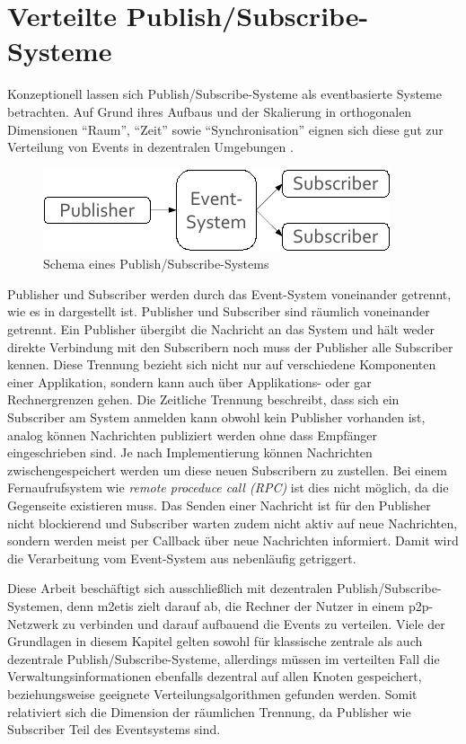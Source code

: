 \section{Verteilte Publish/Subscribe-Systeme}
\label{chap:grundlagen:pubsub}
Konzeptionell lassen sich Publish/Subscribe-Systeme als eventbasierte Systeme betrachten. Auf Grund ihres Aufbaus und der Skalierung  in orthogonalen Dimensionen \enquote{Raum}, \enquote{Zeit} sowie \enquote{Synchronisation} eignen sich diese gut zur Verteilung von Events in dezentralen Umgebungen \cite{PatrickTh2003Many, Cugola2002Using}.

\begin{figure}[htbp]
\centering
\includegraphics{grafics/pubsub_black_box.pdf}
\caption{Schema eines Publish/Subscribe-Systems}
\label{fig:pubsub_black_box}
\end{figure}

Publisher und Subscriber werden durch das Event-System voneinander getrennt, wie es in  dargestellt ist.  Publisher und Subscriber sind räumlich voneinander getrennt. Ein Publisher übergibt die Nachricht an das System und hält weder direkte Verbindung mit den Subscribern noch muss der Publisher alle Subscriber kennen. Diese Trennung bezieht sich nicht nur auf verschiedene Komponenten einer Applikation, sondern kann auch über Applikations- oder gar Rechnergrenzen gehen. Die Zeitliche Trennung beschreibt, dass sich ein Subscriber am System anmelden kann obwohl kein Publisher vorhanden ist, analog können Nachrichten publiziert werden ohne dass Empfänger eingeschrieben sind. Je nach Implementierung können Nachrichten zwischengespeichert werden um diese neuen Subscribern zu zustellen. Bei einem Fernaufrufsystem wie \emph{remote proceduce call (RPC)} \cite{Birrell1984Implementing} ist dies nicht möglich, da die Gegenseite existieren muss. Das Senden einer Nachricht ist für den Publisher nicht blockierend und Subscriber warten zudem nicht aktiv auf neue Nachrichten, sondern werden meist per Callback über neue Nachrichten informiert. Damit wird die Verarbeitung vom Event-System aus nebenläufig getriggert.

Diese Arbeit beschäftigt sich ausschließlich mit dezentralen Publish/Subscribe-Sys\-temen, denn \ac{m2etis} zielt darauf ab, die Rechner der Nutzer in einem p2p-Netzwerk zu verbinden und darauf aufbauend die Events zu verteilen. Viele der Grundlagen in diesem Kapitel gelten sowohl für klassische zentrale als auch dezentrale Publish/Subscribe-Systeme, allerdings müssen im verteilten Fall die Verwaltungsinformationen ebenfalls dezentral auf allen Knoten gespeichert, beziehungsweise geeignete Verteilungsalgorithmen gefunden werden. Somit relativiert sich die Dimension der räumlichen Trennung, da Publisher wie Subscriber Teil des Eventsystems sind.

